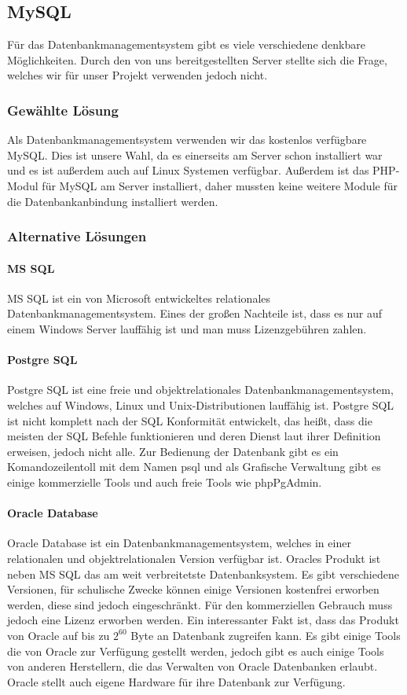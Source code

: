 \subsection{MySQL}
Für das Datenbankmanagementsystem gibt es viele verschiedene denkbare Möglichkeiten. Durch den von uns bereitgestellten Server stellte sich die Frage, welches wir für unser Projekt verwenden jedoch nicht.
\subsubsection{Gewählte Lösung}
Als Datenbankmanagementsystem verwenden wir das kostenlos verfügbare MySQL. Dies ist unsere Wahl, da es einerseits am Server schon installiert war und es ist außerdem auch auf Linux Systemen verfügbar. Außerdem ist das PHP-Modul für MySQL am Server installiert, daher mussten keine weitere Module für die Datenbankanbindung installiert werden.
\subsubsection{Alternative Lösungen} 
\paragraph{MS SQL}
MS SQL ist ein von Microsoft entwickeltes relationales Datenbankmanagementsystem. Eines der großen Nachteile ist, dass es nur auf einem Windows Server lauffähig ist und man muss Lizenzgebühren zahlen.
\paragraph{Postgre SQL}
Postgre SQL ist eine freie und objektrelationales Datenbankmanagementsystem, welches auf Windows, Linux und Unix-Distributionen lauffähig ist. Postgre SQL ist nicht komplett nach der SQL Konformität entwickelt, das heißt, dass die meisten der SQL Befehle funktionieren und deren Dienst laut ihrer Definition erweisen, jedoch nicht alle. Zur Bedienung der Datenbank gibt es ein Komandozeilentoll mit dem Namen psql und als Grafische Verwaltung gibt es einige kommerzielle Tools und auch freie Tools wie phpPgAdmin.
\paragraph{Oracle Database}
Oracle Database ist ein Datenbankmanagementsystem, welches in einer relationalen und objektrelationalen Version verfügbar ist. Oracles Produkt ist neben MS SQL das am weit verbreitetste Datenbanksystem. Es gibt verschiedene Versionen, für schulische Zwecke können einige Versionen kostenfrei erworben werden, diese sind jedoch eingeschränkt. Für den kommerziellen Gebrauch muss jedoch eine Lizenz erworben werden. Ein interessanter Fakt ist, dass das Produkt von Oracle auf bis zu $ 2^{60} $ Byte an Datenbank zugreifen kann. Es gibt einige Tools die von Oracle zur Verfügung gestellt werden, jedoch gibt es auch einige Tools von anderen Herstellern, die das Verwalten von Oracle Datenbanken erlaubt. Oracle stellt auch eigene Hardware für ihre Datenbank zur Verfügung.